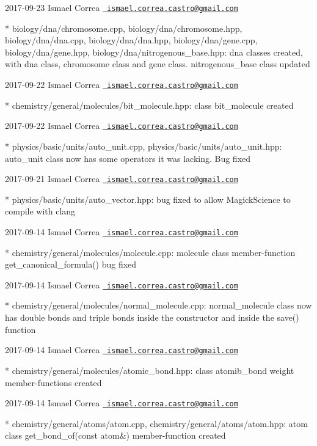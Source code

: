  2017-\/09-\/23 Ismael Correa \href{mailto:ismael.correa.castro@gmail.com}{\texttt{ ismael.\+correa.\+castro@gmail.\+com}} \begin{DoxyVerb}* biology/dna/chromosome.cpp, biology/dna/chromosome.hpp,
biology/dna/dna.cpp, biology/dna/dna.hpp, biology/dna/gene.cpp,
biology/dna/gene.hpp, biology/dna/nitrogenous_base.hpp: dna classes
created, with dna class, chromosome class and gene class.
nitrogenous_base class updated
\end{DoxyVerb}
 2017-\/09-\/22 Ismael Correa \href{mailto:ismael.correa.castro@gmail.com}{\texttt{ ismael.\+correa.\+castro@gmail.\+com}} \begin{DoxyVerb}* chemistry/general/molecules/bit_molecule.hpp: class bit_molecule
created
\end{DoxyVerb}
 2017-\/09-\/22 Ismael Correa \href{mailto:ismael.correa.castro@gmail.com}{\texttt{ ismael.\+correa.\+castro@gmail.\+com}} \begin{DoxyVerb}* physics/basic/units/auto_unit.cpp,
physics/basic/units/auto_unit.hpp: auto_unit class now has some
operators it was lacking. Bug fixed
\end{DoxyVerb}
 2017-\/09-\/21 Ismael Correa \href{mailto:ismael.correa.castro@gmail.com}{\texttt{ ismael.\+correa.\+castro@gmail.\+com}} \begin{DoxyVerb}* physics/basic/units/auto_vector.hpp: bug fixed to allow
MagickScience to compile with clang
\end{DoxyVerb}
 2017-\/09-\/14 Ismael Correa \href{mailto:ismael.correa.castro@gmail.com}{\texttt{ ismael.\+correa.\+castro@gmail.\+com}} \begin{DoxyVerb}* chemistry/general/molecules/molecule.cpp: molecule class
member-function get_canonical_formula() bug fixed
\end{DoxyVerb}
 2017-\/09-\/14 Ismael Correa \href{mailto:ismael.correa.castro@gmail.com}{\texttt{ ismael.\+correa.\+castro@gmail.\+com}} \begin{DoxyVerb}* chemistry/general/molecules/normal_molecule.cpp: normal_molecule
class now has double bonds and triple bonds inside the constructor
and inside the save() function
\end{DoxyVerb}
 2017-\/09-\/14 Ismael Correa \href{mailto:ismael.correa.castro@gmail.com}{\texttt{ ismael.\+correa.\+castro@gmail.\+com}} \begin{DoxyVerb}* chemistry/general/molecules/atomic_bond.hpp: class atomib_bond
weight member-functions created
\end{DoxyVerb}
 2017-\/09-\/14 Ismael Correa \href{mailto:ismael.correa.castro@gmail.com}{\texttt{ ismael.\+correa.\+castro@gmail.\+com}} \begin{DoxyVerb}* chemistry/general/atoms/atom.cpp,
chemistry/general/atoms/atom.hpp: atom class get_bond_of(const
atom&) member-function created
\end{DoxyVerb}
